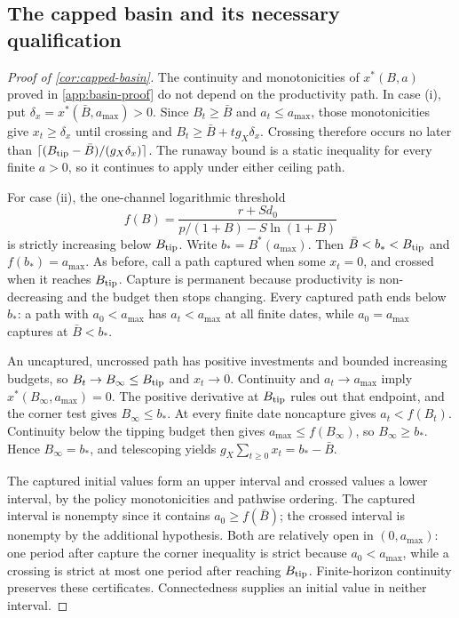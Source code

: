 \subsection{The capped basin and its necessary qualification}
\label{app:capped-basin-proof}
\begin{proof}[Proof of \cref{cor:capped-basin}]
The continuity and monotonicities of $x^*(B,a)$ proved in
\cref{app:basin-proof} do not depend on the productivity path.
In case (i), put $\delta_x=x^*(\bar B,a_{\max})>0$.
Since $B_t\geq\bar B$ and $a_t\leq a_{\max}$, those monotonicities give
$x_t\geq\delta_x$ until crossing and
$B_t\geq\bar B+t g_X\delta_x$. Crossing therefore occurs no later than
$\lceil(B_{\rm tip}-\bar B)/(g_X\delta_x)\rceil$.
The runaway bound is a static inequality for every finite $a>0$, so it
continues to apply under either ceiling path.

For case (ii), the one-channel logarithmic threshold
\[
 f(B)=\frac{r+Sd_0}{p/(1+B)-S\ln(1+B)}
\]
is strictly increasing below $B_{\rm tip}$. Write $b_*=B^*(a_{\max})$.
Then $\bar B<b_*<B_{\rm tip}$ and $f(b_*)=a_{\max}$.
As before, call a path captured when some $x_t=0$, and crossed when it
reaches $B_{\rm tip}$. Capture is permanent because productivity is
non-decreasing and the budget then stops changing. Every captured path
ends below $b_*$: a path with $a_0<a_{\max}$ has $a_t<a_{\max}$ at
all finite dates, while $a_0=a_{\max}$ captures at $\bar B<b_*$.

An uncaptured, uncrossed path has positive investments and bounded
increasing budgets, so $B_t\to B_\infty\leq B_{\rm tip}$ and $x_t\to0$.
Continuity and $a_t\to a_{\max}$ imply
$x^*(B_\infty,a_{\max})=0$. The positive derivative at $B_{\rm tip}$
rules out that endpoint, and the corner test gives $B_\infty\leq b_*$.
At every finite date noncapture gives $a_t<f(B_t)$. Continuity below
the tipping budget then gives $a_{\max}\leq f(B_\infty)$, so
$B_\infty\geq b_*$. Hence $B_\infty=b_*$, and telescoping yields
$g_X\sum_{t\geq0}x_t=b_*-\bar B$.

The captured initial values form an upper interval and crossed values a
lower interval, by the policy monotonicities and pathwise ordering.
The captured interval is nonempty since it contains $a_0\geq f(\bar B)$;
the crossed interval is nonempty by the additional hypothesis. Both are
relatively open in $(0,a_{\max})$: one period after capture the corner
inequality is strict because $a_0<a_{\max}$, while a crossing is strict
at most one period after reaching $B_{\rm tip}$. Finite-horizon
continuity preserves these certificates. Connectedness supplies an initial
value in neither interval.


\end{proof}
